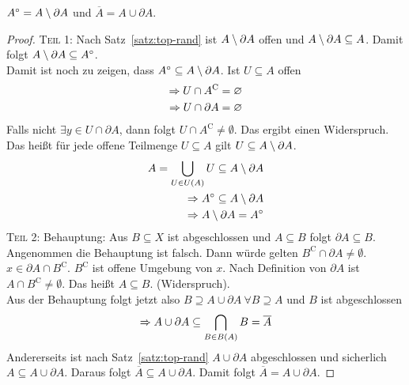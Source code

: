 \begin{satz} %
    $A^{\circ} = A \setminus \partial A$ und $\overline{A} = A \cup \partial A$.
    \begin{proof}
        \textsc{Teil 1}: Nach Satz~\ref{satz:top-rand} ist $A\setminus \partial A$ offen und $A \setminus \partial A \subseteq A$. Damit folgt $A \setminus \partial A \subseteq A^{\circ}$.\\
        Damit ist noch zu zeigen, dass $A^{\circ} \subseteq A \setminus \partial A$. Ist $U\subseteq A$ offen
        \begin{align*}
            \Rightarrow{} U\cap A^{\mathrm{C}} &= \varnothing \\
            \Rightarrow{} U \cap \partial A &= \varnothing
        \end{align*}
        Falls nicht $\exists y \in U \cap \partial A$, dann folgt $U\cap A^{\mathrm{C}} \neq \emptyset$. Das ergibt einen Widerspruch.\\
        Das heißt für jede offene Teilmenge $U\subseteq A$ gilt $U\subseteq A\setminus \partial A$.
        \begin{align*}
            A = \bigcup_{U\in U\of{A}} U \subseteq A \exclude \partial A\\
            \impl A^{\circ} \subseteq A \exclude \partial A\\
            \impl A \exclude \partial A = A^{\circ}
        \end{align*}
        \textsc{Teil 2}: Behauptung: Aus $B\subseteq X$ ist abgeschlossen und $A \subseteq B$ folgt $\partial A \subseteq B$. Angenommen die Behauptung ist falsch. Dann würde gelten $B^{\mathrm{C}} \cap \partial A \neq \emptyset$.\\
        $x\in \partial A \cap B^{\mathrm{C}}$. $B^{\mathrm{C}}$ ist offene Umgebung von $x$. Nach Definition von $\partial A$ ist $A\cap B^{\mathrm{C}}\neq \emptyset$. Das heißt $A \subseteq B$. (Widerspruch).\\
        Aus der Behauptung folgt jetzt also $B \supseteq A \cup \partial A~\forall B\supseteq A$ und $B$ ist abgeschlossen
        \begin{align*}
            \impl A \cup \partial A \subseteq \bigcap_{B\in B\of{A}} B = \overline{A}
        \end{align*}
        Andererseits ist nach Satz~\ref{satz:top-rand} $A \cup \partial A$ abgeschlossen und sicherlich $A \subseteq A \cup \partial A$. Daraus folgt $\overline{A} \subseteq A \cup\partial A$. Damit folgt $\overline{A} = A \cup \partial A$.
    \end{proof}
\end{satz}

\newpage
